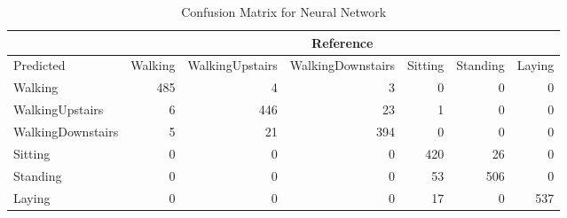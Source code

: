 \begin{table}[ht]
\centering
\caption{Confusion Matrix for Neural Network} 
\label{tab:conmat_nn1}
\begin{tabular}{l|rrrrrr}
  &\multicolumn{6}{c}{Reference}\\
 \hline
Predicted & Walking & WalkingUpstairs & WalkingDownstairs & Sitting & Standing & Laying \\ 
  \hline
Walking & 485 &   4 &   3 &   0 &   0 &   0 \\ 
  WalkingUpstairs &   6 & 446 &  23 &   1 &   0 &   0 \\ 
  WalkingDownstairs &   5 &  21 & 394 &   0 &   0 &   0 \\ 
  Sitting &   0 &   0 &   0 & 420 &  26 &   0 \\ 
  Standing &   0 &   0 &   0 &  53 & 506 &   0 \\ 
  Laying &   0 &   0 &   0 &  17 &   0 & 537 \\ 
   \hline
\end{tabular}
\end{table}
